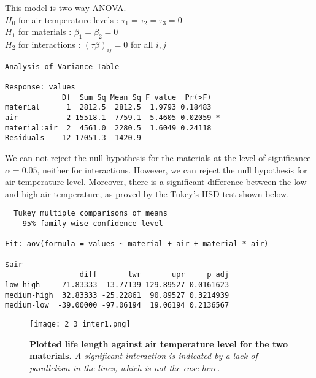 \documentclass{article}
\begin{document}
This model is two-way ANOVA. \\
$H_0$ for air temperature levels : $ \tau_1 = \tau_2 = \tau_3 =0$\\
$H_1$ for materials : $ \beta_1 = \beta_2=0$\\
$H_2$ for interactions : $(\tau\beta)_{ij}=0$ for all $i,j$
\begin{verbatim}
Analysis of Variance Table

Response: values
             Df  Sum Sq Mean Sq F value  Pr(>F)  
material      1  2812.5  2812.5  1.9793 0.18483  
air           2 15518.1  7759.1  5.4605 0.02059 *
material:air  2  4561.0  2280.5  1.6049 0.24118  
Residuals    12 17051.3  1420.9                  
\end{verbatim}
We can not reject the null hypothesis for the materials at the level of significance $\alpha=0.05$, neither for interactions. However, we can reject the null hypothesis for air temperature level. Moreover, there is a significant difference between the low and high air temperature, as proved by the Tukey's HSD test shown below. 
\begin{verbatim}
  Tukey multiple comparisons of means
    95% family-wise confidence level

Fit: aov(formula = values ~ material + air + material * air)

$air
                 diff       lwr       upr     p adj
low-high     71.83333  13.77139 129.89527 0.0161623
medium-high  32.83333 -25.22861  90.89527 0.3214939
medium-low  -39.00000 -97.06194  19.06194 0.2136567
\end{verbatim}
\begin{figure}[H]
	  \centering
  	\texttt{[image: 2\_3\_inter1.png]}
  	\caption{\textbf{Plotted life length against air temperature level for the two materials.} \textsl{A significant interaction is indicated by a lack of parallelism in the lines, which is not the case here.}}
	\end{figure}
\end{document}
